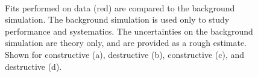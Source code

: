 \begin{figure}[!htpb]
\centering
{}
 \\
\caption{Fits performed on data (red) are compared to the background simulation. The background simulation is used only to study performance and systematics. The uncertainties on the background simulation are theory only, and are provided as a rough estimate.
Shown for \ee constructive (a), \ee destructive (b), \mm constructive (c), and \mm destructive (d).}
\label{fig:ciCiFitVsMc}
\end{figure}




